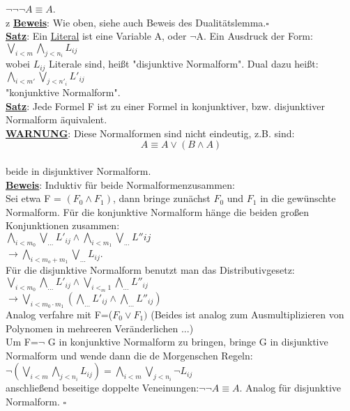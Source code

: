 \documentclass[a4paper]{scrartcl}
\begin{document}
$\neg\neg\neg A \equiv A$.\\z
\textbf{\underline{Beweis}}: Wie oben, siehe auch Beweis des Dualitätslemma.$\square$\\
\textbf{\underline{Satz}}: Ein \underline{Literal} ist eine Variable A, oder $\neg $A. Ein Ausdruck der Form:\\
$\bigvee\limits_{i<m}\bigwedge\limits_{j<n_i} L_{ij}$\\
wobei $L_{ij}$ Literale sind, heißt "disjunktive Normalform". Dual dazu heißt:\\
$\bigwedge\limits_{i<m'}\bigvee\limits_{j<n'_i}L'_{ij}$\\
"konjunktive Normalform".\\
\textbf{\underline{Satz}}: Jede Formel F ist zu einer Formel in konjunktiver, bzw. disjunktiver Normalform äquivalent.\\
\textbf{\underline{WARNUNG}}: Diese Normalformen sind nicht eindeutig, z.B. sind:\\
$$A\equiv A \lor (B\land A)$$\\
beide in disjunktiver Normalform.\\
\textbf{\underline{Beweis}}: Induktiv für beide Normalformenzusammen:\\
Sei etwa F = $(F_0 \land F_1)$, dann bringe zunächst $F_0$ und $F_1$ in die gewünschte Normalform. Für die konjunktive Normalform hänge die beiden großen Konjunktionen zusammen:\\
$\bigwedge\limits_{i<m_0}\bigvee\limits_{...} L'_{ij} \land \bigwedge\limits_{i<m_1} \bigvee\limits_{...} L''{ij}$\\
$\rightarrow \bigwedge\limits_{i<m_o+m_1}\bigvee\limits_{...} L_{ij}$.\\
Für die disjunktive Normalform benutzt man das Distributivgesetz:\\
$\bigvee\limits_{i<m_0}\bigwedge\limits_{...}L'_{ij} \land \bigvee\limits_{i<_m1}\bigwedge\limits_{...} L''_{ij}$\\
$\rightarrow \bigvee\limits_{i< m_0\cdot m_1} ( \bigwedge\limits_{...} L'_{ij} \land \bigwedge\limits_{...} L''_{ij})$\\
Analog verfahre mit F=($F_0\lor F_1)$ (Beides ist analog zum Ausmultiplizieren von Polynomen in mehreeren Veränderlichen ...)\\
Um F=$\neg$ G in konjunktive Normalform zu bringen, bringe G in disjunktive Normalform und wende dann die de Morgenschen Regeln:\\
$\neg (\bigvee\limits_{i<m}\bigwedge\limits_{j<n_i}L_{ij})=\bigwedge\limits_{i<m}\bigvee\limits_{j<n_i} \neg L_{ij}$\\
anschließend beseitige doppelte Veneinungen:$\neg\neg A\equiv A$. Analog für disjunktive Normalform. $\square$
\end{document}
